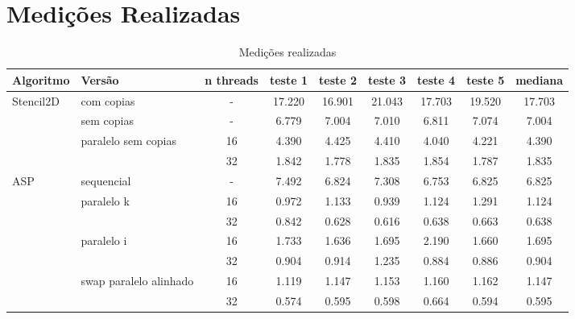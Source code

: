 \documentclass[a4paper]{report}
\begin{document}
\appendix

\chapter{Medições Realizadas}
\label{ch:medicoes}

\begin{table}[h]
\centering
\begin{tabular}{|l|l|c|c|c|c|c|c|c|}
\hline
Algoritmo &
  Versão &
  \multicolumn{1}{l|}{n threads} &
  \multicolumn{1}{l|}{teste 1} &
  \multicolumn{1}{l|}{teste 2} &
  \multicolumn{1}{l|}{teste 3} &
  \multicolumn{1}{l|}{teste 4} &
  \multicolumn{1}{l|}{teste 5} &
  \multicolumn{1}{l|}{mediana} \\ \hline
\multirow{4}{*}{Stencil2D} & com copias                              & -  & 17.220 & 16.901 & 21.043 & 17.703 & 19.520 & 17.703 \\ \cline{2-9}
                           & sem copias                              & -  & 6.779  & 7.004  & 7.010  & 6.811  & 7.074  & 7.004  \\ \cline{2-9}
                           & \multirow{2}{*}{paralelo sem copias}    & 16 & 4.390  & 4.425  & 4.410  & 4.040  & 4.221  & 4.390  \\ \cline{3-9}
                           &                                         & 32 & 1.842  & 1.778  & 1.835  & 1.854  & 1.787  & 1.835  \\ \hline
\multirow{7}{*}{ASP}       & sequencial                              & -  & 7.492  & 6.824  & 7.308  & 6.753  & 6.825  & 6.825  \\ \cline{2-9}
                           & \multirow{2}{*}{paralelo k}             & 16 & 0.972  & 1.133  & 0.939  & 1.124  & 1.291  & 1.124  \\ \cline{3-9}
                           &                                         & 32 & 0.842  & 0.628  & 0.616  & 0.638  & 0.663  & 0.638  \\ \cline{2-9}
                           & \multirow{2}{*}{paralelo i}             & 16 & 1.733  & 1.636  & 1.695  & 2.190  & 1.660  & 1.695  \\ \cline{3-9}
                           &                                         & 32 & 0.904  & 0.914  & 1.235  & 0.884  & 0.886  & 0.904  \\ \cline{2-9}
                           & \multirow{2}{*}{swap paralelo alinhado} & 16 & 1.119  & 1.147  & 1.153  & 1.160  & 1.162  & 1.147  \\ \cline{3-9}
                           &                                         & 32 & 0.574  & 0.595  & 0.598  & 0.664  & 0.594  & 0.595  \\ \hline
\end{tabular}
\caption{Medições realizadas}
\label{tab:medicoes}
\end{table}
\end{document}

